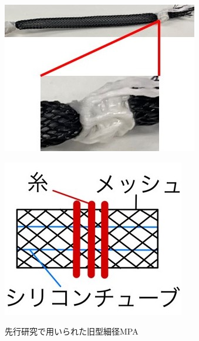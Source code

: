 \begin{figure}[!hb]
  \begin{minipage}{0.49\hsize}
    \centering  
    \includegraphics[scale=0.5]{image/MPA_tanbu_1_1.jpg}
    \label{fig:MPA_tanbu_1_1}
  \end{minipage}
  \begin{minipage}{0.5\hsize}
    \centering
    \includegraphics[scale=0.5]{image/MPA_tanbu_1_2.jpg}
    \label{fig:MPA_tanbu_1_2}
  \end{minipage}
  \caption{先行研究で用いられた旧型細径MPA}
  \label{fig:MPA_tanbu_1}
\end{figure}
%
